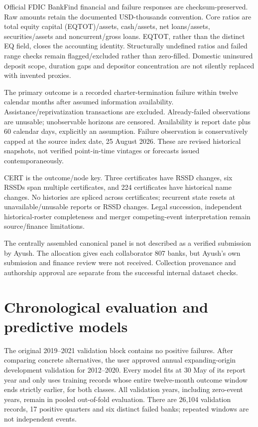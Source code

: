 \documentclass[11pt]{article}
\begin{document}
Official FDIC BankFind financial and failure responses are checksum-preserved. Raw amounts retain the documented USD-thousands convention. Core ratios are total equity capital (EQTOT)/assets, cash/assets, net loans/assets, securities/assets and noncurrent/gross loans. EQTOT, rather than the distinct EQ field, closes the accounting identity. Structurally undefined ratios and failed range checks remain flagged/excluded rather than zero-filled. Domestic uninsured deposit scope, duration gaps and depositor concentration are not silently replaced with invented proxies.

The primary outcome is a recorded charter-termination failure within twelve calendar months after assumed information availability. Assistance/reprivatization transactions are excluded. Already-failed observations are unusable; unobservable horizons are censored. Availability is report date plus 60 calendar days, explicitly an assumption. Failure observation is conservatively capped at the source index date, 25 August 2026. These are revised historical snapshots, not verified point-in-time vintages or forecasts issued contemporaneously.

CERT is the outcome/node key. Three certificates have RSSD changes, six RSSDs span multiple certificates, and 224 certificates have historical name changes. No histories are spliced across certificates; recurrent state resets at unavailable/unusable reports or RSSD changes. Legal succession, independent historical-roster completeness and merger competing-event interpretation remain source/finance limitations.

The centrally assembled canonical panel is not described as a verified submission by Ayush. The allocation gives each collaborator 807 banks, but Ayush's own submission and finance review were not received. Collection provenance and authorship approval are separate from the successful internal dataset checks.

\section{Chronological evaluation and predictive models}
The original 2019--2021 validation block contains no positive failures. After comparing concrete alternatives, the user approved annual expanding-origin development validation for 2012--2020. Every model fits at 30 May of its report year and only uses training records whose entire twelve-month outcome window ends strictly earlier, for both classes. All validation years, including zero-event years, remain in pooled out-of-fold evaluation. There are 26,104 validation records, 17 positive quarters and six distinct failed banks; repeated windows are not independent events.
\end{document}

